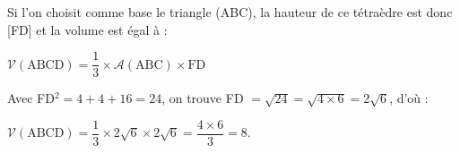 \documentclass[10pt]{article}
\begin{document}
\begin{enumerate}
\begin{enumerate}
Si l'on choisit comme base le triangle (ABC), la hauteur de ce tétraèdre est donc [FD] et la volume est égal à :

$\mathcal{V}(\text{ABCD}) = \dfrac13 \times \mathcal{A}(\text{ABC}) \times \text{FD}$

Avec FD$^2 = 4 + 4 + 16 = 24$, on trouve FD $ = \sqrt{24} = \sqrt{4 \times 6} = 2\sqrt{6}$, d'où :

$\mathcal{V}(\text{ABCD}) = \dfrac13 \times 2 \sqrt{6} \times 2\sqrt{6} = \dfrac{4 \times 6}{3} = 8$.
	\end{enumerate}
\end{enumerate}

\bigskip
\end{document}
